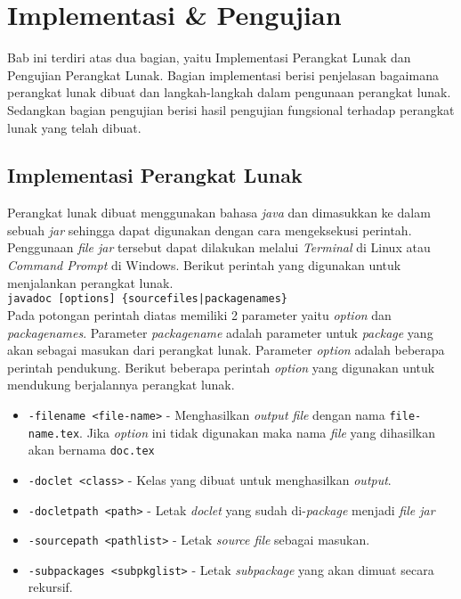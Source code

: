 \lstset{style=mystyle}
\chapter{Implementasi \& Pengujian}
\label{sec: Implementasi & Pengujian}

Bab ini terdiri atas dua bagian, yaitu Implementasi Perangkat Lunak dan Pengujian Perangkat Lunak. Bagian implementasi berisi penjelasan bagaimana perangkat lunak dibuat dan langkah-langkah dalam pengunaan perangkat lunak. Sedangkan bagian pengujian berisi hasil pengujian fungsional terhadap perangkat lunak yang telah dibuat.
\section{Implementasi Perangkat Lunak}
\label{sec: Implementasi Perangkat Lunak}

Perangkat lunak dibuat menggunakan bahasa {\it java} dan dimasukkan ke dalam sebuah {\it jar} sehingga dapat digunakan dengan cara mengeksekusi perintah. Penggunaan {\it file jar} tersebut dapat dilakukan melalui {\it Terminal} di Linux atau {\it Command Prompt} di Windows. Berikut perintah yang digunakan untuk menjalankan perangkat lunak.
\\

{\tt javadoc [options] \{sourcefiles|packagenames\}}
\\

Pada potongan perintah diatas memiliki 2 parameter yaitu {\it option} dan {\it packagenames}. Parameter {\it packagename} adalah parameter untuk {\it package} yang akan sebagai masukan dari perangkat lunak. Parameter {\it option} adalah beberapa perintah pendukung. Berikut beberapa perintah {\it option} yang digunakan untuk mendukung berjalannya perangkat lunak.
\begin{itemize}
	\item {\tt -filename <file-name>} - Menghasilkan {\it output file} dengan nama {\tt file-name.tex}. Jika {\it option} ini tidak digunakan maka nama {\it file} yang dihasilkan akan bernama {\tt doc.tex}
	\item {\tt -doclet <class>} - Kelas yang dibuat untuk menghasilkan {\it output}.
	\item {\tt -docletpath <path>} - Letak {\it doclet} yang sudah di-{\it package} menjadi {\it file jar}
	\item {\tt -sourcepath <pathlist>} - Letak {\it source file} sebagai masukan.
	\item {\tt -subpackages <subpkglist>} - Letak {\it subpackage} yang akan dimuat secara rekursif.
\end{itemize}

